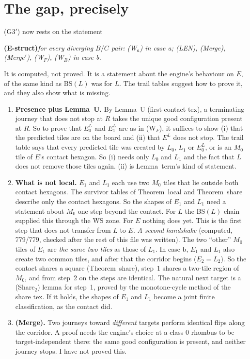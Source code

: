 \documentclass[11pt]{article}
\theoremstyle{definition}\newtheorem{definition}[theorem]{Definition}\newtheorem{remark}[theorem]{Remark}
\begin{document}
\section{The gap, precisely}\label{sec:gap}
(G3$'$) now rests on the statement
\begin{center}
\textbf{(E-struct)}\quad\emph{for every diverging $B/C$ pair: (W$_a$) in case a; (LEN), (Merge), (Merge$'$), (W$_F$), (W$_B$) in case b.}
\end{center}
It is computed, not proved. It is a statement about the engine's behaviour on $E$, of the same kind as BS$(L)$ was for $L$. The trail tables suggest how to prove it, and they also show what is missing.
\begin{enumerate}
\item \textbf{Presence plus Lemma~U.} By Lemma~U (first-contact tex), a terminating journey that does not stop at $R$ takes the unique good configuration present at $R$. So to prove that $E^L_0$ and $E^L_1$ are as in (W$_F$), it suffices to show (i) that the predicted tiles are on the board and (ii) that $E^L$ does not stop. The trail table says that every predicted tile was created by $L_0$, $L_1$ or $E^L_0$, or is an $M_0$ tile of $E$'s contact hexagon. So (i) needs only $L_0$ and $L_1$ and the fact that $L$ does not remove those tiles again. (ii) is Lemma~term's kind of statement.
\item \textbf{What is not local.} $E_1$ and $L_1$ each use two $M_0$ tiles that lie outside both contact hexagons. The survivor tables of Theorem~local and Theorem~share describe only the contact hexagons. So the shapes of $E_1$ and $L_1$ need a statement about $M_0$ one step beyond the contact. For $L$ the BS$(L)$ chain supplied this through the WS zone. For $E$ nothing does yet. This is the first step that does not transfer from $L$ to $E$.
\emph{A second handshake} (computed, 779/779, checked after the rest of this file was written). The two ``other'' $M_0$ tiles of $E_1$ are \emph{the same two tiles} as those of $L_1$. In case b, $E_1$ and $L_1$ also create two common tiles, and after that the corridor begins ($E_2=L_2$). So the contact shares a square (Theorem~share), step~1 shares a two-tile region of $M_0$, and from step~2 on the steps are identical. The natural next target is a (Share$_2$) lemma for step~1, proved by the monotone-cycle method of the share tex. If it holds, the shapes of $E_1$ and $L_1$ become a joint finite classification, as the contact did.
\item \textbf{(Merge).} Two journeys toward \emph{different} targets perform identical flips along the corridor. A proof needs the engine's choice at a class-0 rhombus to be target-independent there: the same good configuration is present, and neither journey stops. I have not proved this.
\end{enumerate}
\end{document}
